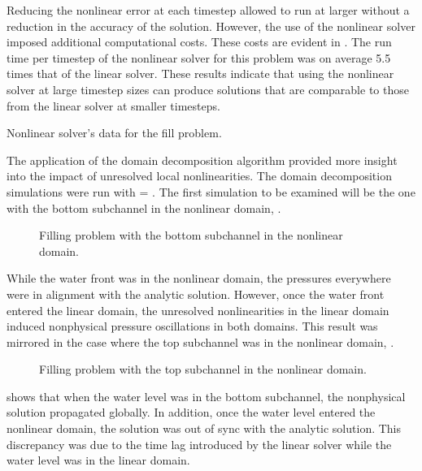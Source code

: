 Reducing the nonlinear error at each timestep allowed \cobra{} to run at larger \dt{} without a reduction in the accuracy of the solution.
However, the use of the nonlinear solver imposed additional computational costs.
These costs are evident in .
The run time per timestep of the nonlinear solver for this problem was on average 5.5 times that of the linear solver.
These results indicate that using the nonlinear solver at large timestep sizes can produce solutions that are comparable to those from the linear solver at smaller timesteps.

\begin{table}[h!tb]
\centering
\singlespace

\caption{Nonlinear solver's data for the fill problem.}
\label{tab:vmpNlnRunTime}
\end{table}

The application of the domain decomposition algorithm provided more insight into the impact of unresolved local nonlinearities.
The domain decomposition simulations were run with \dtmax{} = .
The first simulation to be examined will be the one with the bottom subchannel in the nonlinear domain, .

\begin{figure}[h!tb]
\centering

\caption{Filling problem with the bottom subchannel in the nonlinear domain.}
\label{fig:vmpDDBotChan}
\end{figure}

While the water front was in the nonlinear domain, the pressures everywhere were in alignment with the analytic solution.
However, once the water front entered the linear domain, the unresolved nonlinearities in the linear domain induced nonphysical pressure oscillations in both domains.
This result was mirrored in the case where the top subchannel was in the nonlinear domain, .

\begin{figure}[h!tb]
\centering

\caption{Filling problem with the top subchannel in the nonlinear domain.}
\label{fig:vmpDDTopChan}
\end{figure}

 shows that when the water level was in the bottom subchannel, the nonphysical solution propagated globally.
In addition, once the water level entered the nonlinear domain, the solution was out of sync with the analytic solution.
This discrepancy was due to the time lag introduced by the linear solver while the water level was in the linear domain.

